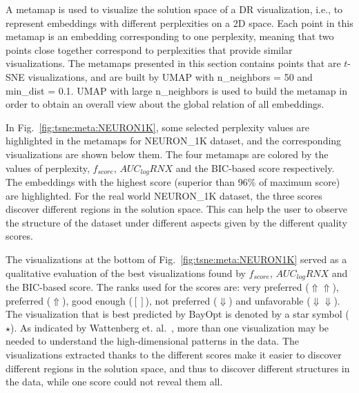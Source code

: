 A metamap is used to visualize the solution space of a DR visualization, i.e., to represent embeddings with different perplexities on a 2D space.
Each point in this metamap is an embedding corresponding to one perplexity, meaning that two points close together correspond to perplexities that provide similar visualizations.
The metamaps presented in this section contains points that are $t$-SNE visualizations, and are built by UMAP with {n\_neighbors} = 50 and {min\_dist} = 0.1.
UMAP with large {n\_neighbors} is used to build the metamap in order to obtain an overall view about the global relation of all embeddings.

In Fig.~\ref{fig:tsne:meta:NEURON1K}, some selected perplexity values are highlighted in the metamaps for {NEURON\_1K} dataset, and the corresponding visualizations are shown below them.
The four metamaps are colored by the values of perplexity, $f_{score}$, $AUC_{log}RNX$ and the BIC-based score respectively.
The embeddings with the highest score (superior than 96\% of maximum score) are highlighted.
For the real world {NEURON\_1K} dataset, the three scores discover different regions in the solution space. This can help the user to observe the structure of the dataset under different aspects given by the different quality scores.

The visualizations at the bottom of Fig.~\ref{fig:tsne:meta:NEURON1K} served as a qualitative evaluation of the best visualizations found by $f_{score}$, $AUC_{log}RNX$ and the BIC-based score.
The ranks used for the scores are: very preferred ($\Uparrow\Uparrow$), preferred ($\Uparrow$), good enough ($[]$), not preferred ($\Downarrow$) and unfavorable ($\Downarrow\Downarrow$).
The visualization that is best predicted by BayOpt is denoted by a star symbol ($\star$).
As indicated by Wattenberg et. al.~\cite{wattenberg2016use}, more than one visualization may be needed to understand the high-dimensional patterns in the data.
The visualizations extracted thanks to the different scores make it easier to discover different regions in the solution space, and thus to discover different structures in the data, while one score could not reveal them all.

